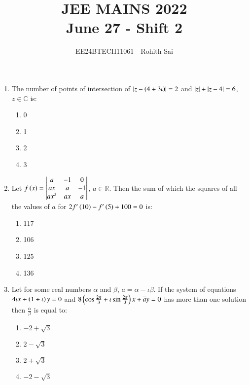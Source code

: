 \documentclass[journal]{IEEEtran}
\begin{document}

\vspace{3cm}

\title{JEE MAINS 2022\\June 27 - Shift 2}
\author{EE24BTECH11061 - Rohith Sai}
\maketitle

\renewcommand{\thefigure}{\theenumi}
\renewcommand{\thetable}{\theenumi}
\begin{enumerate}
\item   The number of points of intersection of $\left\vert z-\left(4+3\iota\right)\right\vert = 2$ and $\left\vert z\right\vert + \left\vert z-4\right\vert = 6$, $z \in \mathbb{C}$ is:
\begin{multicols}{2}
    \begin{enumerate}
        \item 0
        \item 1
        \item 2
        \item 3
    \end{enumerate}
\end{multicols}

\item Let $f\left(x\right) = \begin{vmatrix}a & -1 & 0\\ax & a & -1\\ax^2 & ax & a\end{vmatrix}$, $a \in \mathbb{R}$. Then the sum of which the squares of all the values of $a$ for $2f^{\prime}\left(10\right) - f^{\prime}\left(5\right) + 100 =0$ is:
\begin{multicols}{2}
    \begin{enumerate}
        \item 117
        \item 106
        \item 125
        \item 136
    \end{enumerate}
\end{multicols}

\item Let for some real numbers $\alpha$ and $\beta$, $a = \alpha - \iota\beta$. If the system of equations $4\iota x + \left(1+\iota\right)y = 0$ and $8\left(\cos{\frac{2\pi}{3}} + \iota \sin{\frac{2\pi}{3}}\right)x + \overline{a} y = 0$ has more than one solution then $\frac{\alpha}{\beta}$ is equal to:
\begin{multicols}{2}
    \begin{enumerate}
        \item $-2+\sqrt{3}$
        \item $2-\sqrt{3}$
        \item $2+\sqrt{3}$
        \item $-2-\sqrt{3}$
    \end{enumerate}
\end{multicols}


\end{enumerate}
\end{document}
